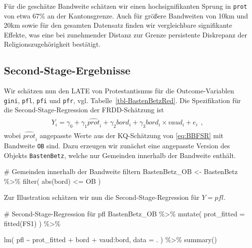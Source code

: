 \documentclass[
  a4paper,
  DIV=11,
  oneside]{scrreprt}
\newenvironment{Shaded}{\begin{snugshade}}{\end{snugshade}}
\newcommand{\AttributeTok}[1]{\textcolor[rgb]{0.40,0.45,0.13}{#1}}
\newcommand{\CommentTok}[1]{\textcolor[rgb]{0.37,0.37,0.37}{#1}}
\newcommand{\FunctionTok}[1]{\textcolor[rgb]{0.28,0.35,0.67}{#1}}
\newcommand{\NormalTok}[1]{\textcolor[rgb]{0.00,0.23,0.31}{#1}}
\newcommand{\OtherTok}[1]{\textcolor[rgb]{0.00,0.23,0.31}{#1}}
\newcommand{\SpecialCharTok}[1]{\textcolor[rgb]{0.37,0.37,0.37}{#1}}
\begin{document}
Für die geschätze Bandweite schätzen wir einen hochsignifikanten Sprung
in \texttt{prot} von etwa 67\% an der Kantonsgrenze. Auch für größere
Bandweiten von 10km und 20km sowie für den gesamten Datensatz finden wir
vergleichbare signifikante Effekte, was eine bei zunehmender Distanz zur
Grenze persistente Diskrepanz der Religionszugehörigkeit bestätigt.

\subsection{Second-Stage-Ergebnisse}\label{second-stage-ergebnisse}

Wir schätzen nun den LATE von Protestantismus für die Outcome-Variablen
\texttt{gini}, \texttt{pfl}, \texttt{pfi} und \texttt{pfr}, vgl.
Tabelle~\ref{tbl-BastenBetzRed}. Die Spezifikation für die
Second-Stage-Regression der FRDD-Schätzung ist \begin{align}
  \begin{split}
    Y_i = \gamma_0 + \gamma_1 \widehat{prot}_i +  \gamma_2 bord_i + \gamma_3 bord_i  \times vaud_i + e_i
  \end{split},
\end{align} wobei \(\widehat{prot}_i\) angepasste Werte aus der
KQ-Schätzung von \eqref{eq:BBFSR} mit Bandweite \texttt{OB} sind. Dazu
erzeugen wir zunächst eine angepasste Version des Objekts
\texttt{BastenBetz}, welche nur Gemeinden innerhalb der Bandweite
enthält.

\begin{Shaded}
\begin{Highlighting}[]
\CommentTok{\# Gemeinden innerhalb der Bandweite filtern}
\NormalTok{BastenBetz\_OB }\OtherTok{\textless{}{-}}\NormalTok{ BastenBetz }\SpecialCharTok{\%\textgreater{}\%} 
  \FunctionTok{filter}\NormalTok{(}
    \FunctionTok{abs}\NormalTok{(bord) }\SpecialCharTok{\textless{}=}\NormalTok{ OB}
\NormalTok{  )}
\end{Highlighting}
\end{Shaded}

Zur Illustration schätzen wir nun die Second-Stage-Regression für
\(Y = pfl\).

\begin{Shaded}
\begin{Highlighting}[]
\CommentTok{\# Second{-}Stage{-}Regression für \textasciigrave{}pfl\textasciigrave{}}
\NormalTok{BastenBetz\_OB }\SpecialCharTok{\%\textgreater{}\%} 
  \FunctionTok{mutate}\NormalTok{(}
    \AttributeTok{prot\_fitted =} \FunctionTok{fitted}\NormalTok{(FS1)}
\NormalTok{    ) }\SpecialCharTok{\%\textgreater{}\%}

\FunctionTok{lm}\NormalTok{(}
\NormalTok{  pfl }\SpecialCharTok{\textasciitilde{}}\NormalTok{ prot\_fitted }\SpecialCharTok{+}\NormalTok{ bord }\SpecialCharTok{+}\NormalTok{ vaud}\SpecialCharTok{:}\NormalTok{bord, }
  \AttributeTok{data =}\NormalTok{ .}
\NormalTok{) }\SpecialCharTok{\%\textgreater{}\%} 
  \FunctionTok{summary}\NormalTok{()}
\end{Highlighting}
\end{Shaded}
\end{document}
